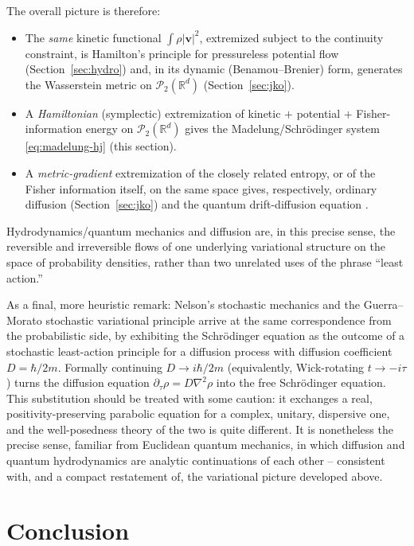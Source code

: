 \documentclass[11pt]{article}
\newcommand{\lap}{\nabla^2}
\newcommand{\bv}{\mathbf{v}}
\begin{document}
The overall picture is therefore:
\begin{itemize}
\item[--] The \emph{same} kinetic functional $\int \rho|\bv|^2$, extremized subject to the continuity constraint, is Hamilton's principle for pressureless potential flow (Section~\ref{sec:hydro}) and, in its dynamic (Benamou--Brenier) form, generates the Wasserstein metric on $\mathcal P_2(\mathbb R^d)$ (Section~\ref{sec:jko}).
\item[--] A \emph{Hamiltonian} (symplectic) extremization of kinetic $+$ potential $+$ Fisher-information energy on $\mathcal P_2(\mathbb R^d)$ gives the Madelung/Schr\"odinger system \eqref{eq:madelung-hj} (this section).
\item[--] A \emph{metric-gradient} extremization of the closely related entropy, or of the Fisher information itself, on the same space gives, respectively, ordinary diffusion (Section~\ref{sec:jko}) and the quantum drift-diffusion equation \cite{GianazzaSavareToscani2009}.
\end{itemize}
Hydrodynamics/quantum mechanics and diffusion are, in this precise sense, the reversible and irreversible flows of one underlying variational structure on the space of probability densities, rather than two unrelated uses of the phrase ``least action.''

As a final, more heuristic remark: Nelson's stochastic mechanics \cite{Nelson1966} and the Guerra--Morato stochastic variational principle \cite{GuerraMorato1983} arrive at the same correspondence from the probabilistic side, by exhibiting the Schr\"odinger equation as the outcome of a stochastic least-action principle for a diffusion process with diffusion coefficient $D=\hbar/2m$. Formally continuing $D \to i\hbar/2m$ (equivalently, Wick-rotating $t\to -i\tau$) turns the diffusion equation $\partial_\tau\rho = D\lap\rho$ into the free Schr\"odinger equation. This substitution should be treated with some caution: it exchanges a real, positivity-preserving parabolic equation for a complex, unitary, dispersive one, and the well-posedness theory of the two is quite different. It is nonetheless the precise sense, familiar from Euclidean quantum mechanics, in which diffusion and quantum hydrodynamics are analytic continuations of each other -- consistent with, and a compact restatement of, the variational picture developed above.

\section{Conclusion}
\label{sec:conclusion}
\end{document}
